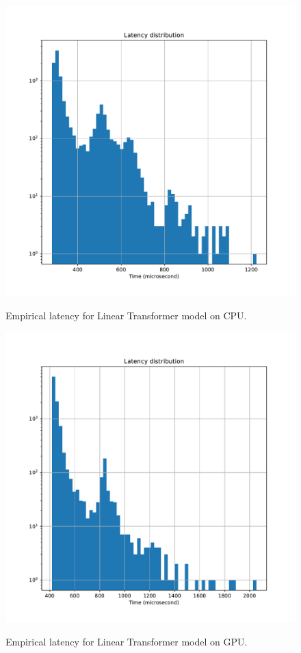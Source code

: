 \documentclass[a4paper, twoside]{report}
\theoremstyle{definition}
\numberwithin{equation}{section}
\begin{document}
\begin{figure}[h!]
    \centering
    \caption{Empirical latency for Linear Transformer model on CPU.}
    \includegraphics[width=\textwidth]{etc/linear_transformer_cpu_latency.pdf}
    \label{fig:linear_transformer_cpu_latency}
\end{figure}

\begin{figure}[h!]
    \centering
    \caption{Empirical latency for Linear Transformer model on GPU.}
    \includegraphics[width=\textwidth]{etc/linear_transformer_gpu_latency.pdf}
    \label{fig:linear_transformer_gpu_latency}
\end{figure}




\end{document}
